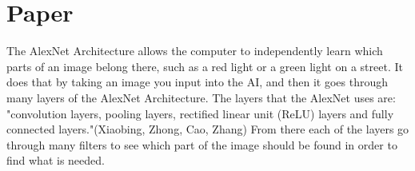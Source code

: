 \chapter{Paper}
\label{Paper}
\thispagestyle{empty}


The AlexNet Architecture allows the computer to independently learn which parts of an image belong there, such as a red light or a green light on a street. It does that by taking an image you input into the AI, and then it goes through many layers of the AlexNet Architecture. The layers that the AlexNet uses are: "convolution layers, pooling layers,
rectified linear unit (ReLU) layers and fully connected layers."(Xiaobing, Zhong, Cao, Zhang) From there each of the layers go through many filters to see which part of the image should be found in order to find what is needed.
\newline

